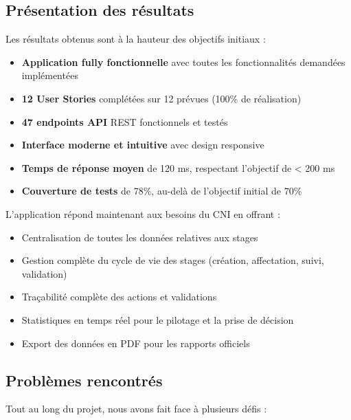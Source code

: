 \documentclass[12pt,a4paper]{report}
\begin{document}
\subsection*{Présentation des résultats}

Les résultats obtenus sont à la hauteur des objectifs initiaux :

\begin{itemize}[leftmargin=1cm]
    \item \textbf{Application fully fonctionnelle} avec toutes les fonctionnalités demandées implémentées
    \item \textbf{12 User Stories} complétées sur 12 prévues (100\% de réalisation)
    \item \textbf{47 endpoints API} REST fonctionnels et testés
    \item \textbf{Interface moderne et intuitive} avec design responsive
    \item \textbf{Temps de réponse moyen} de 120 ms, respectant l'objectif de < 200 ms
    \item \textbf{Couverture de tests} de 78\%, au-delà de l'objectif initial de 70\%
\end{itemize}

L'application répond maintenant aux besoins du CNI en offrant :

\begin{itemize}[leftmargin=1cm]
    \item Centralisation de toutes les données relatives aux stages
    \item Gestion complète du cycle de vie des stages (création, affectation, suivi, validation)
    \item Traçabilité complète des actions et validations
    \item Statistiques en temps réel pour le pilotage et la prise de décision
    \item Export des données en PDF pour les rapports officiels
\end{itemize}

\subsection*{Problèmes rencontrés}

Tout au long du projet, nous avons fait face à plusieurs défis :
\end{document}
